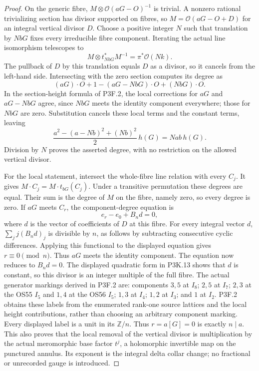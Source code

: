 \begin{proof}
On the generic fibre,
\(M\otimes\mathcal O(aG-O)^{-1}\) is trivial.  A nonzero
rational trivializing section has divisor supported on fibres,
so
\(M=\mathcal O(aG-O+D)\) for an integral vertical divisor
\(D\).  Choose a positive integer \(N\) such that
translation by \(NbG\) fixes every irreducible fibre
component.  Iterating the actual line isomorphism telescopes to
\[
 M\otimes t_{NbG}^*M^{-1}=\pi^*\mathcal O(Nk).
\]
The pullback of \(D\) by this translation equals \(D\)
as a divisor, so it cancels from the left-hand side.  Intersecting
with the zero section computes its degree as
\[
 (aG)\cdot O+1-(aG-NbG)\cdot O+(NbG)\cdot O.
\]
In the section-height formula of P3F.2, the local corrections
for \(aG\) and \(aG-NbG\) agree, since \(NbG\) meets
the identity component everywhere; those for \(NbG\) are
zero.  Substitution cancels these local terms and the constant
terms, leaving
\[
 \frac{a^2-(a-Nb)^2+(Nb)^2}{2}\,h(G)
                         =Nab\,h(G).
\]
Division by \(N\) proves the asserted degree, with no
restriction on the allowed vertical divisor.

For the local statement, intersect the whole-fibre line relation
with every \(C_j\).  It gives
\(M\cdot C_j=M\cdot t_{bG}(C_j)\).  Under a transitive
permutation these degrees are equal.  Their sum is the degree
of \(M\) on the fibre, namely zero, so every degree is zero.
If \(aG\) meets \(C_r\), the component-degree equation is
\[
                   e_r-e_0+B_n d=0,
\]
where \(d\) is the vector of coefficients of \(D\) at this
fibre.  For every integral vector \(d\),
\(\sum_j j(B_nd)_j\) is divisible by \(n\), as follows
by subtracting consecutive cyclic differences.  Applying this
functional to the displayed equation gives \(r\equiv0\pmod n\).
Thus \(aG\) meets the identity component.  The equation
now reduces to \(B_nd=0\).  The displayed quadratic form
in P3K.13 shows that \(d\) is constant, so this divisor is
an integer multiple of the full fibre.  The actual generator
markings derived in P3F.2 are: components \(3,5\) at \(I_8\);
\(2,5\) at \(I_7\); \(2,3\) at the OS55 \(I_5\)
and \(1,4\) at the OS56 \(I_5\); \(1,3\) at \(I_4\);
\(1,2\) at \(I_3\); and \(1\) at \(I_2\).
P3F.2 obtains these labels from the enumerated rank-one source
lattices and the local height contributions, rather than choosing
an arbitrary component marking.  Every displayed label is a unit
in its \(\mathbb Z/n\).  Thus \(r=a[G]=0\) is exactly
\(n\mid a\).  This also proves that the local removal of
the vertical divisor is multiplication by the actual meromorphic
base factor \(t^j\), a holomorphic invertible map on the
punctured annulus.  Its exponent is the integral delta collar
change; no fractional or unrecorded gauge is introduced.
\end{proof}

